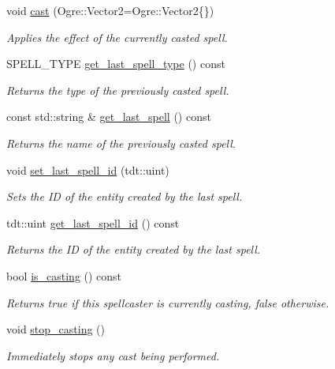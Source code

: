 \begin{DoxyCompactItemize}
void \hyperlink{class_spellcaster_a602c7b78f2c8a512002422624b651c1d}{cast} (Ogre\+::\+Vector2=Ogre\+::\+Vector2\{\})
\begin{DoxyCompactList}\small\item\em Applies the effect of the currently casted spell. \end{DoxyCompactList}\item 
S\+P\+E\+L\+L\+\_\+\+T\+Y\+PE \hyperlink{class_spellcaster_a6a7435cd3d8af819a0b1f736ef7d491a}{get\+\_\+last\+\_\+spell\+\_\+type} () const 
\begin{DoxyCompactList}\small\item\em Returns the type of the previously casted spell. \end{DoxyCompactList}\item 
const std\+::string \& \hyperlink{class_spellcaster_a303e54a79abbf32acce747440600f573}{get\+\_\+last\+\_\+spell} () const 
\begin{DoxyCompactList}\small\item\em Returns the name of the previously casted spell. \end{DoxyCompactList}\item 
void \hyperlink{class_spellcaster_aea41ed591b51c20d0b3ffc2b4a360a40}{set\+\_\+last\+\_\+spell\+\_\+id} (tdt\+::uint)
\begin{DoxyCompactList}\small\item\em Sets the ID of the entity created by the last spell. \end{DoxyCompactList}\item 
tdt\+::uint \hyperlink{class_spellcaster_ab92d160481f58d7a2eb68332a436a198}{get\+\_\+last\+\_\+spell\+\_\+id} () const 
\begin{DoxyCompactList}\small\item\em Returns the ID of the entity created by the last spell. \end{DoxyCompactList}\item 
bool \hyperlink{class_spellcaster_a7387c8b8df16eaec70d2b75d2a5ad0f8}{is\+\_\+casting} () const 
\begin{DoxyCompactList}\small\item\em Returns true if this spellcaster is currently casting, false otherwise. \end{DoxyCompactList}\item 
void \hyperlink{class_spellcaster_ae836e98789e2f320d1f8f3aa2df5ca0e}{stop\+\_\+casting} ()
\begin{DoxyCompactList}\small\item\em Immediately stops any cast being performed. \end{DoxyCompactList}\end{DoxyCompactItemize}
